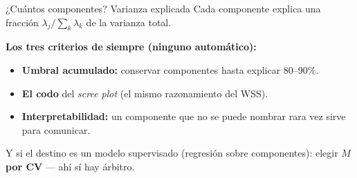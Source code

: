 \documentclass{beamer}
\newcommand{\1}{\mathbb{I}}
\begin{document}
\begin{frame}{¿Cuántos componentes? Varianza explicada}
\small
Cada componente explica una fracción $\lambda_j / \sum_{k} \lambda_k$ de la varianza total.

\vspace{0.15cm}
\begin{center}
\end{center}
\pause

\textbf{Los tres criterios de siempre (ninguno automático):}
\begin{itemize}\itemsep3pt
  \item \textbf{Umbral acumulado:} conservar componentes hasta explicar 80--90\%.
  \item \textbf{El codo} del \emph{scree plot} (el mismo razonamiento del WSS).
  \item \textbf{Interpretabilidad:} un componente que no se puede nombrar rara vez sirve para comunicar.
\end{itemize}
\pause
Y si el destino es un modelo supervisado (regresión sobre componentes): elegir $M$ \textbf{por CV} --- ahí sí hay árbitro.
\end{frame}
\end{document}
